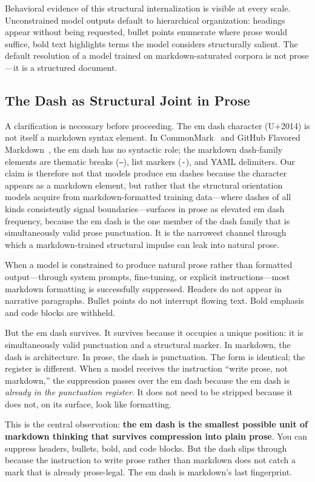 Behavioral evidence of this structural internalization is visible at every scale. Unconstrained model outputs default to hierarchical organization: headings appear without being requested, bullet points enumerate where prose would suffice, bold text highlights terms the model considers structurally salient. The default resolution of a model trained on markdown-saturated corpora is not prose---it is a structured document.

\subsection{The Dash as Structural Joint in Prose}

A clarification is necessary before proceeding. The em dash character (U+2014) is not itself a markdown syntax element. In CommonMark~\cite{commonmark2021} and GitHub Flavored Markdown~\cite{gfm2024}, the em dash has no syntactic role; the markdown dash-family elements are thematic breaks (\texttt{---}), list markers (\texttt{-}), and YAML delimiters. Our claim is therefore not that models produce em dashes because the character appears as a markdown element, but rather that the structural orientation models acquire from markdown-formatted training data---where dashes of all kinds consistently signal boundaries---surfaces in prose as elevated em dash frequency, because the em dash is the one member of the dash family that is simultaneously valid prose punctuation. It is the narrowest channel through which a markdown-trained structural impulse can leak into natural prose.

When a model is constrained to produce natural prose rather than formatted output---through system prompts, fine-tuning, or explicit instructions---most markdown formatting is successfully suppressed. Headers do not appear in narrative paragraphs. Bullet points do not interrupt flowing text. Bold emphasis and code blocks are withheld.

But the em dash survives. It survives because it occupies a unique position: it is simultaneously valid punctuation and a structural marker. In markdown, the dash is architecture. In prose, the dash is punctuation. The form is identical; the register is different. When a model receives the instruction ``write prose, not markdown,'' the suppression passes over the em dash because the em dash is \textit{already in the punctuation register}. It does not need to be stripped because it does not, on its surface, look like formatting.

This is the central observation: \textbf{the em dash is the smallest possible unit of markdown thinking that survives compression into plain prose}. You can suppress headers, bullets, bold, and code blocks. But the dash slips through because the instruction to write prose rather than markdown does not catch a mark that is already prose-legal. The em dash is markdown's last fingerprint.

